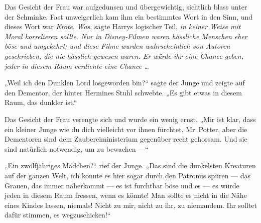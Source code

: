 Das Gesicht der Frau war aufgedunsen und übergewichtig, sichtlich blass unter der Schminke. Fast unweigerlich kam ihm ein bestimmtes Wort in den Sinn, und dieses Wort war \emph{Kröte}.
\emph{Was}, sagte Harrys logischer Teil, \emph{in keiner Weise mit Moral korrelieren sollte. Nur in Disney-Filmen waren hässliche Menschen eher böse und umgekehrt; und diese Filme wurden wahrscheinlich von Autoren geschrieben, die nie hässlich gewesen waren. Er würde ihr eine Chance geben, jeder in diesem Raum verdiente eine Chance …}

„Weil ich den Dunklen Lord losgeworden bin?“ sagte der Junge und zeigte auf den Dementor, der hinter Hermines Stuhl schwebte.
„Es gibt etwas in diesem Raum, das dunkler ist.“

Das Gesicht der Frau verengte sich und wurde ein wenig ernst.
„Mir ist klar, dass ein kleiner Junge wie du dich vielleicht vor ihnen fürchtet, Mr~Potter, aber die Dementoren sind dem Zaubereiministerium gegenüber recht gehorsam. Und sie sind natürlich notwendig, um zu bewachen —“

„Ein zwölfjähriges Mädchen?“ rief der Junge.
„Das sind die dunkelsten Kreaturen auf der ganzen Welt, ich konnte es hier sogar durch den Patronus spüren — das Grauen, das immer näherkommt — es ist furchtbar böse und es — es würde jeden in diesem Raum fressen, wenn es könnte! Man sollte es nicht in die Nähe eines Kindes lassen, niemals! Nicht zu mir, nicht zu ihr, zu niemandem. Ihr solltet dafür stimmen, es wegzuschicken!“

